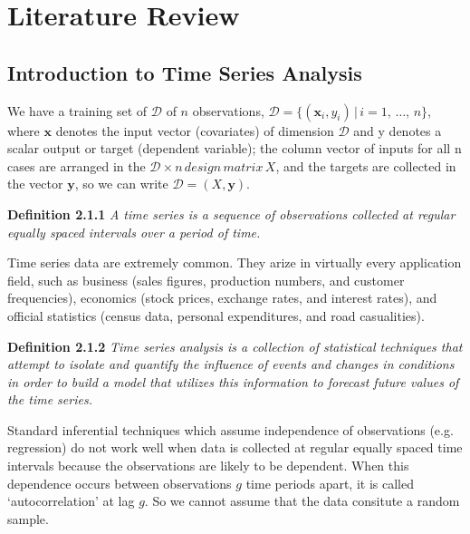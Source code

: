 \section{Literature Review}

   \subsection{Introduction to Time Series Analysis}

      \cite{Rasmussen2006} We have a training set of \(\mathcal{D}\) of \(n\) observations, \(\mathcal{D} = \{(\mathbf{x}_{i}, y_{i}) \, | \, i = 1, \, \ldots, \, n\}\), where \(\mathbf{x}\) denotes the input vector (covariates) of dimension \(\mathcal{D}\) and y denotes a scalar output or target (dependent variable); the column vector of inputs for all n cases are arranged in the \(\mathcal{D} \times n \, design \, matrix\, X\), and the targets are collected in the vector \(\mathbf{y}\), so we can write \(\mathcal{D} = (X, \mathbf{y})\). 

      \vspace{1em}

      \textbf{Definition 2.1.1} \cite{Watson2025} \textit{A time series is a sequence of observations collected at regular equally spaced intervals over a period of time.}

      \vspace{1em}

      Time series data are extremely common. They arize in virtually every application field, such as business (sales figures, production numbers, and customer frequencies), economics (stock prices, exchange rates, and interest rates), and official statistics (census data, personal expenditures, and road casualities).

      \vspace{1em}

      \textbf{Definition 2.1.2} \cite{Watson2025} \textit{Time series analysis is a collection of statistical techniques that attempt to isolate and quantify the influence of events and changes in conditions in order to build a model that utilizes this information to forecast future values of the time series.}

      \vspace{1em}

      Standard inferential techniques which assume independence of observations (e.g. regression) do not work well when data is collected at regular equally spaced time intervals because the observations are likely to be dependent. When this dependence occurs between observations \(g\) time periods apart, it is called `autocorrelation' at lag \(g\). So we cannot assume that the data consitute a random sample.

